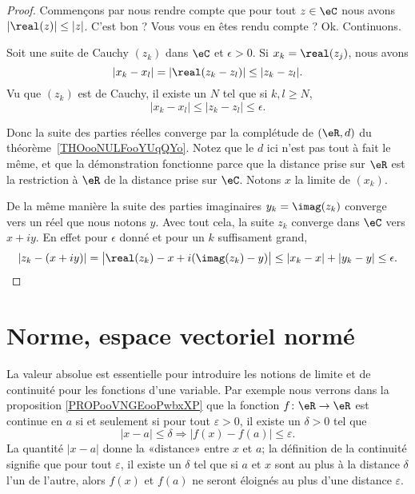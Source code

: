 \begin{proof}
	Commençons par nous rendre compte que pour tout \( z\in \eC\) nous avons \( | \real(z) |\leq | z |\). C'est bon ? Vous vous en êtes rendu compte ? Ok. Continuons.

	Soit une suite de Cauchy \( (z_k)\) dans \( \eC\) et \( \epsilon>0\). Si \( x_k=\real(z_j)\), nous avons
	\begin{equation}
		| x_k-x_l |=| \real(z_k-z_l) |\leq | z_k-z_l |.
	\end{equation}
	Vu que \( (z_k)\) est de Cauchy, il existe un \( N\) tel que si \( k,l\geq N\),
	\begin{equation}
		| x_k-x_l |\leq | z_k-z_l |\leq \epsilon.
	\end{equation}

	Donc la suite des parties réelles converge par la complétude de \( (\eR,d)\) du théorème~\ref{THOooNULFooYUqQYo}. Notez que le \( d\) ici n'est pas tout à fait le même, et que la démonstration fonctionne parce que la distance prise sur \( \eR\) est la restriction à \( \eR\) de la distance prise sur \( \eC\). Notons \( x\) la limite de \( (x_k)\).

	De la même manière la suite des parties imaginaires \( y_k=\imag(z_k)\) converge vers un réel que nous notons \( y\). Avec tout cela, la suite \( z_k\) converge dans \( \eC\) vers \( x+iy\). En effet pour \( \epsilon\) donné et pour un \( k\) suffisament grand,
	\begin{equation}
		| z_k-(x+iy) |=\big| \real(z_k)-x+i(\imag(z_k)-y) \big|\leq | x_k-x |+| y_k-y |\leq \epsilon.
	\end{equation}
\end{proof}

\section{Norme, espace vectoriel normé}
\label{SECooWKJNooKOqpsx}

La valeur absolue est essentielle pour introduire les notions de limite et de continuité pour les fonctions d'une variable. Par exemple nous verrons dans la proposition \ref{PROPooVNGEooPwbxXP} que la fonction \( f\colon \eR\to \eR\) est continue en \( a\) si et seulement si pour tout \( \varepsilon > 0\), il existe un \( \delta > 0\) tel que
\begin{equation}
	| x-a |\leq\delta \Rightarrow | f(x)-f(a) |\leq \varepsilon.
\end{equation}
La quantité \( | x-a |\) donne la «distance» entre \( x\) et \( a\); la définition de la continuité signifie que pour tout \( \varepsilon\), il existe un \( \delta\) tel que si \( a\) et \( x\) sont au plus à la distance \( \delta\) l'un de l'autre, alors \( f(x)\) et \( f(a)\) ne seront éloignés au plus d'une distance \( \varepsilon\).

